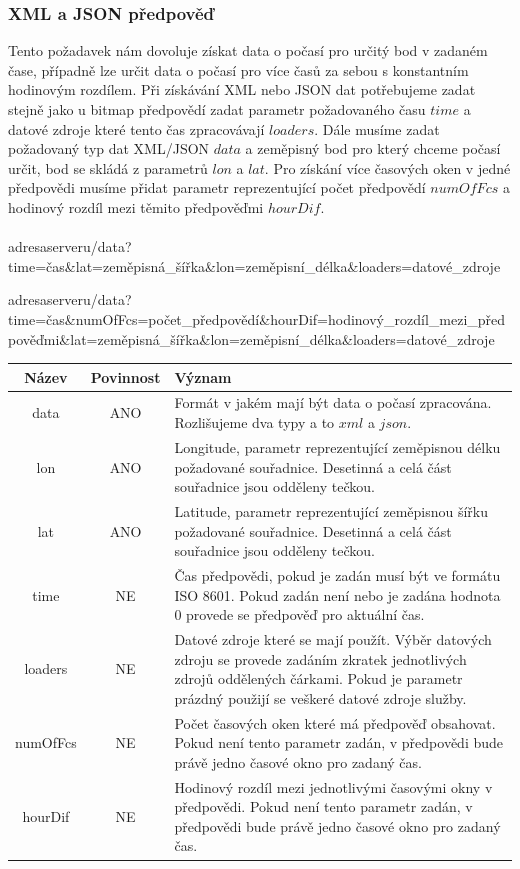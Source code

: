 \documentclass[czech,bachelor,dept460,male,csharp,cpdeclaration]{diploma}
\begin{document}
	\subsubsection{XML a JSON předpověď}
	
	Tento požadavek nám dovoluje získat data o počasí pro určitý bod v zadaném čase, případně lze určit data o počasí pro více časů za sebou s konstantním hodinovým rozdílem. Při získávání XML nebo JSON dat potřebujeme zadat stejně jako u bitmap předpovědí zadat parametr požadovaného času $time$ a datové zdroje které tento čas zpracovávají $loaders$. Dále musíme zadat požadovaný typ dat XML/JSON $data$ a zeměpisný bod pro který chceme počasí určit, bod se skládá z parametrů $lon$ a $lat$. Pro získání více časových oken v jedné předpovědi musíme přidat parametr reprezentující počet předpovědí $numOfFcs$ a hodinový rozdíl mezi těmito předpověďmi $hourDif$.
	\\\\
	adresaserveru/{data}?time={čas}\&lat={zeměpisná\_šířka}\&lon={zeměpisní\_délka}\&loaders={datové\_zdroje}
	
	adresaserveru/{data}?time={čas}\&numOfFcs={počet\_předpovědí}\&hourDif={hodinový\_rozdíl\_mezi\_předpověďmi}\&lat={zeměpisná\_šířka}\&lon={zeměpisní\_délka}\&loaders={datové\_zdroje}
	
	\begin{center}
		\begin{tabular}{c c p{13cm}}
			Název & Povinnost & Význam \\
			\midrule
			data & ANO & Formát v jakém mají být data o počasí zpracována. Rozlišujeme dva typy a to $xml$ a $json$.\\
			lon & ANO & Longitude, parametr reprezentující zeměpisnou délku požadované souřadnice. Desetinná a celá část souřadnice jsou odděleny tečkou.\\
			lat & ANO & Latitude, parametr reprezentující zeměpisnou šířku požadované souřadnice. Desetinná a celá část souřadnice jsou odděleny tečkou.\\
			time & NE & Čas předpovědi, pokud je zadán musí být ve formátu ISO 8601. Pokud zadán není nebo je zadána hodnota 0  provede se předpověď pro aktuální čas.\\ 
			loaders & NE & Datové zdroje které se mají použít. Výběr datových zdroju se provede zadáním zkratek jednotlivých zdrojů oddělených čárkami. Pokud je parametr prázdný použijí se veškeré datové zdroje služby. \\
			numOfFcs & NE & Počet časových oken které má předpověď obsahovat. Pokud není tento parametr zadán, v předpovědi bude právě jedno časové okno pro zadaný čas.\\
			hourDif & NE & Hodinový rozdíl mezi jednotlivými časovými okny v předpovědi. Pokud není tento parametr zadán, v předpovědi bude právě jedno časové okno pro zadaný čas.\\
		\end{tabular}
	\end{center}
\end{document}

